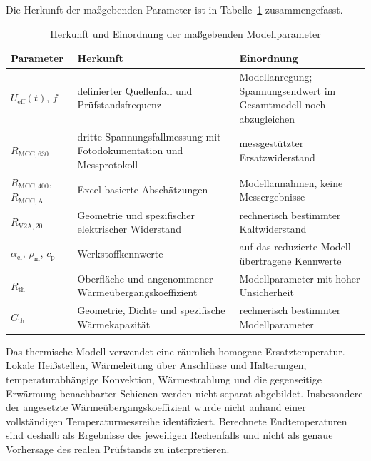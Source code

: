 Die Herkunft der maßgebenden Parameter ist in
Tabelle~\ref{tab:kap5_parameterherkunft} zusammengefasst.

\begin{table}[H]
    \centering
    \caption{Herkunft und Einordnung der maßgebenden Modellparameter}
    \label{tab:kap5_parameterherkunft}
    \begin{tabularx}{\textwidth}{@{}p{}
        p{}X@{}}
        \toprule
        Parameter & Herkunft & Einordnung \\
        \midrule
        \(U_\mathrm{eff}(t)\), \(f\) &
        definierter Quellenfall und Prüfstandsfrequenz &
        Modellanregung; Spannungsendwert im Gesamtmodell noch abzugleichen \\

        \(R_\mathrm{MCC,630}\) &
        dritte Spannungsfallmessung mit Fotodokumentation und Messprotokoll &
        messgestützter Ersatzwiderstand \\

        \(R_\mathrm{MCC,400}\), \(R_\mathrm{MCC,A}\) &
        Excel-basierte Abschätzungen &
        Modellannahmen, keine Messergebnisse \\

        \(R_\mathrm{V2A,20}\) &
        Geometrie und spezifischer elektrischer Widerstand &
        rechnerisch bestimmter Kaltwiderstand \\

        \(\alpha_\mathrm{el}\), \(\rho_\mathrm{m}\), \(c_\mathrm{p}\) &
        Werkstoffkennwerte &
        auf das reduzierte Modell übertragene Kennwerte \\

        \(R_\mathrm{th}\) &
        Oberfläche und angenommener Wärmeübergangskoeffizient &
        Modellparameter mit hoher Unsicherheit \\

        \(C_\mathrm{th}\) &
        Geometrie, Dichte und spezifische Wärmekapazität &
        rechnerisch bestimmter Modellparameter \\
        \bottomrule
    \end{tabularx}
\end{table}

Das thermische Modell verwendet eine räumlich homogene Ersatztemperatur.
Lokale Heißstellen, Wärmeleitung über Anschlüsse und Halterungen,
temperaturabhängige Konvektion, Wärmestrahlung und die gegenseitige Erwärmung
benachbarter Schienen werden nicht separat abgebildet. Insbesondere der
angesetzte Wärmeübergangskoeffizient wurde nicht anhand einer vollständigen
Temperaturmessreihe identifiziert. Berechnete Endtemperaturen sind deshalb als
Ergebnisse des jeweiligen Rechenfalls und nicht als genaue Vorhersage des
realen Prüfstands zu interpretieren.

